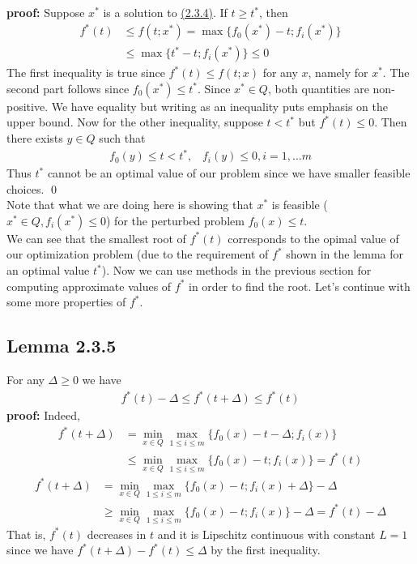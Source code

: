 \documentclass[12pt,a4paper]{article}
\begin{document}
	 \textbf{proof:} Suppose $x^*$ is a solution to \hyperref[sec:2.3.4]{(2.3.4)}. If $t \geq t^*$, then
	 \begin{align*}
	 	f^*(t) &\leq f(t;x^*) = \max\{f_0(x^*) - t;f_i(x^*)\} \\
	 	&\leq \max\{t^* - t; f_i(x^*)\} \leq 0
	 \end{align*}
	 The first inequality is true since $f^*(t) \leq f(t;x)$ for any $x$, namely for $x^*$. The second part follows since $f_0(x^*) \leq t^*$. Since $x^* \in Q$, both quantities are non-positive. We have equality but writing as an inequality puts emphasis on the upper bound. 
	 Now for the other inequality, suppose $t < t^*$ but $f^*(t) \leq 0$. Then there exists $y \in Q$ such that
	 \begin{align*}
	 	f_0(y) \leq t < t^*, \hspace{10pt} f_i(y) \leq 0, i = 1, \ldots m
	 \end{align*}
	 Thus $t^*$ cannot be an optimal value of our problem since we have smaller feasible choices. \qed \\
	 Note that what we are doing here is showing that $x^*$ is feasible ($x^* \in Q, f_i(x^*) \leq 0$) for the perturbed problem $f_0(x) \leq t$.\\
	 We can see that the smallest root of $f^*(t)$ corresponds to the opimal value of our optimization problem (due to the requirement of $f^*$ shown in the lemma for an optimal value $t^*$). Now we can use methods in the previous section for computing approximate values of $f^*$ in order to find the root. Let's continue with some more properties of $f^*$.
	 \subsection*{Lemma 2.3.5}\label{lem235}
	 For any $\Delta \geq 0$ we have
	 \begin{align*}
	 	f^*(t) - \Delta \leq f^*(t + \Delta) \leq f^*(t)
	 \end{align*}
	 \textbf{proof:} Indeed, 
	 \begin{align*}
	 	f^*(t + \Delta) &= \min_{x \in Q}\max_{1 \leq i \leq m}\{f_0(x) - t - \Delta;f_i(x)\} \\
	 	&\leq \min_{x \in Q}\max_{1 \leq i \leq m}\{f_0(x) - t;f_i(x)\} = f^*(t)
	 \end{align*}
	 \begin{align*}
	 	f^*(t + \Delta) &= \min_{x \in Q}\max_{1 \leq i \leq m} \{f_0(x) - t;f_i(x) + \Delta\} - \Delta \\
	 	&\geq \min_{x \in Q}\max_{1 \leq i \leq m}\{f_0(x) - t;f_i(x)\} - \Delta = f^*(t) - \Delta
	 \end{align*}
	 That is, $f^*(t)$ decreases in $t$ and it is Lipschitz continuous with constant $L=1$ since we have $f^*(t+\Delta) - f^*(t) \leq \Delta$ by the first inequality.
\end{document}
